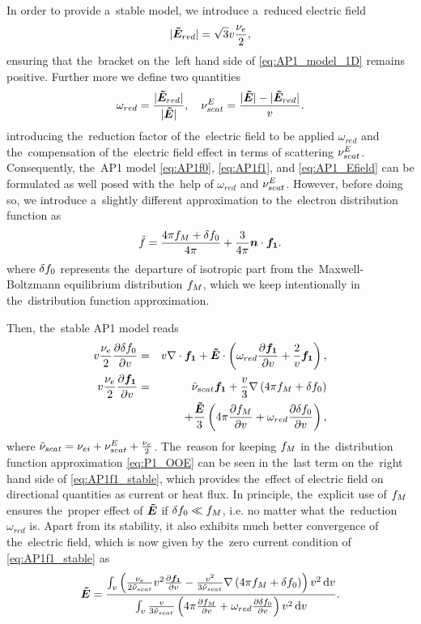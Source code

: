In order to provide a~stable model, we introduce a~reduced electric field
\begin{equation}
  |\boldsymbol{\tilde{E}}_{red}| = \sqrt{3} v\frac{\nu_{e}}{2} ,
  \label{eq:Elimit}
\end{equation}
ensuring that the~bracket on the~left hand side of \eqref{eq:AP1_model_1D}
remains positive. Further more we define two quantities
\begin{equation}
  \omega_{red} = \frac{|\boldsymbol{\tilde{E}}_{red}|}{|\boldsymbol{\tilde{E}}|} ,\quad 
  \nu_{scat}^E = \frac{|\boldsymbol{\tilde{E}}| - |\boldsymbol{\tilde{E}}_{red}|}{v} .
  \nonumber
\end{equation}
introducing the~reduction factor of the~electric field to be applied 
$\omega_{red}$ and the~compensation of the~electric field effect in terms of
scattering $\nu_{scat}^E$. Consequently, the~AP1 model \eqref{eq:AP1f0}, 
\eqref{eq:AP1f1}, and \eqref{eq:AP1_Efield} can be formulated as well posed 
with the~help of $\omega_{red}$ and $\nu_{scat}^E$. However, before doing so,
we introduce a~slightly different approximation to the~electron distribution 
function as
\begin{equation}
  \tilde{f} = \frac{4\pi f_M + \delta f_0}{4\pi} + \frac{3}{4\pi}\boldsymbol{n}\cdot\boldsymbol{f_1} .
  \label{eq:P1_OOE}
\end{equation}
where $\delta f_0$ represents the~departure of isotropic part from 
the~Maxwell-Boltzmann equilibrium distribution $f_M$, which we keep 
intentionally in the~distribution function approximation.

Then, the~stable AP1 model reads
\begin{eqnarray}
  v \frac{\nu_{e}}{2}\frac{\partial{\delta f_0}}{\partial{v}} &=&
  v\nabla\cdot\boldsymbol{f_1} + \boldsymbol{\tilde{E}}\cdot\left(\omega_{red} \frac{\partial{\boldsymbol{f_1}}}{\partial{v}} 
  + \frac{2}{v}\boldsymbol{f_1}\right) , 
  \label{eq:AP1f0_stable}\\
  v\frac{\nu_{e}}{2}\frac{\partial{\boldsymbol{f_1}}}{\partial{v}} 
  &=& \tilde{\nu}_{scat}\boldsymbol{f_1} 
  + \frac{v}{3}\nabla\left(4\pi f_M + \delta f_0\right)
  \nonumber \\
  && 
  + \frac{\boldsymbol{\tilde{E}}}{3}\left(4\pi \frac{\partial{f_M}}{\partial{v}} 
  + \omega_{red} \frac{\partial{\delta f_0}}{\partial{v}} 
  \right) ,
  \label{eq:AP1f1_stable}
\end{eqnarray}
where $\tilde{\nu}_{scat} = \nu_{ei} + \nu_{scat}^E + \frac{\nu_{e}}{2}$.
The~reason for keeping $f_M$ in the~distribution function approximation
\eqref{eq:P1_OOE} can be seen in the~last term on the~right hand side of 
\eqref{eq:AP1f1_stable}, which provides the~effect of electric field on
directional quantities as current or heat flux. In principle, the~explicit use
of $f_M$ ensures the~proper effect of $\boldsymbol{\tilde{E}}$ if $\delta f_0 \ll f_M$, i.e.
no matter what the~reduction $\omega_{red}$ is. Apart from its stability,
it also exhibits much better convergence of the~electric field, which is now
given by the~zero current condition of \eqref{eq:AP1f1_stable} as
\begin{equation}
  \boldsymbol{\tilde{E}} =
  \frac{\int_{v} \left(\frac{\nu_{e}}{2\tilde{\nu}_{scat}}v^2\frac{\partial{\boldsymbol{f_1}}}{\partial{v}}
  - \frac{v^2}{3\tilde{\nu}_{scat}}
  \nabla\left(4\pi f_M + \delta f_0\right)\right) v^2\, \text{d}v}
  {\int_{v} \frac{v}
  {3\tilde{\nu}_{scat}}
  \left(4\pi\frac{\partial{f_M}}{\partial{v}} + \omega_{red} \frac{\partial{\delta f_0}}{\partial{v}}\right)
  v^2\, \text{d}v} .
  \label{eq:AP1_Efield_stable}
\end{equation}

